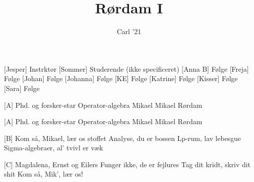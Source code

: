 \documentclass[a4paper,11pt]{article}
\title{Rørdam I}
\author{Carl '21}
\begin{document}
\maketitle

\begin{roles}
[Jesper] Instrktør
[Sommer] Studerende (ikke specificeret)
[Anna B] Følge
[Freja] Følge
[Johan] Følge
[Johanna] Følge
[KE] Følge
[Katrine] Følge
[Kisser] Følge
[Sara] Følge
\end{roles}

\begin{song}
  [A]%
  Phd. og forsker-star
				Operator-algebra
				Mikael
				Mikael Rørdam

  [A]%
  Phd. og forsker-star
				Operator-algebra
				Mikael
				Mikael Rørdam
				
  [B]%
  Kom så, Mikael, lær os stoffet
				Analyse, du er bossen
				Lp-rum, lav lebesgue
				Sigma-algebraer, al' tvivl er væk

  [C]%
  Magdalena, Ernst og Eilers
			   Funger ikke, de er fejlures
			   Tag dit kridt, skriv dit shit
			   Kom så, Mik', lær os!
\end{song}
\end{document}
